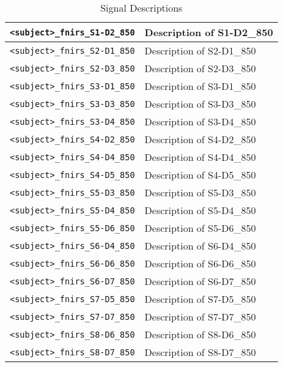 \begin{table}
\begin{tabularx}{\textwidth}{|l|X|}
\hline
\texttt{<subject>\_fnirs\_S1-D2\_850} & Description of S1-D2\_850 \\
\hline
\texttt{<subject>\_fnirs\_S2-D1\_850} & Description of S2-D1\_850 \\
\hline
\texttt{<subject>\_fnirs\_S2-D3\_850} & Description of S2-D3\_850 \\
\hline
\texttt{<subject>\_fnirs\_S3-D1\_850} & Description of S3-D1\_850 \\
\hline
\texttt{<subject>\_fnirs\_S3-D3\_850} & Description of S3-D3\_850 \\
\hline
\texttt{<subject>\_fnirs\_S3-D4\_850} & Description of S3-D4\_850 \\
\hline
\texttt{<subject>\_fnirs\_S4-D2\_850} & Description of S4-D2\_850 \\
\hline
\texttt{<subject>\_fnirs\_S4-D4\_850} & Description of S4-D4\_850 \\
\hline
\texttt{<subject>\_fnirs\_S4-D5\_850} & Description of S4-D5\_850 \\
\hline
\texttt{<subject>\_fnirs\_S5-D3\_850} & Description of S5-D3\_850 \\
\hline
\texttt{<subject>\_fnirs\_S5-D4\_850} & Description of S5-D4\_850 \\
\hline
\texttt{<subject>\_fnirs\_S5-D6\_850} & Description of S5-D6\_850 \\
\hline
\texttt{<subject>\_fnirs\_S6-D4\_850} & Description of S6-D4\_850 \\
\hline
\texttt{<subject>\_fnirs\_S6-D6\_850} & Description of S6-D6\_850 \\
\hline
\texttt{<subject>\_fnirs\_S6-D7\_850} & Description of S6-D7\_850 \\
\hline
\texttt{<subject>\_fnirs\_S7-D5\_850} & Description of S7-D5\_850 \\
\hline
\texttt{<subject>\_fnirs\_S7-D7\_850} & Description of S7-D7\_850 \\
\hline
\texttt{<subject>\_fnirs\_S8-D6\_850} & Description of S8-D6\_850 \\
\hline
\texttt{<subject>\_fnirs\_S8-D7\_850} & Description of S8-D7\_850 \\
\hline
\end{tabularx}
\caption{Signal Descriptions}
\label{tab:fNIRS_raw_signals}
\end{table}

